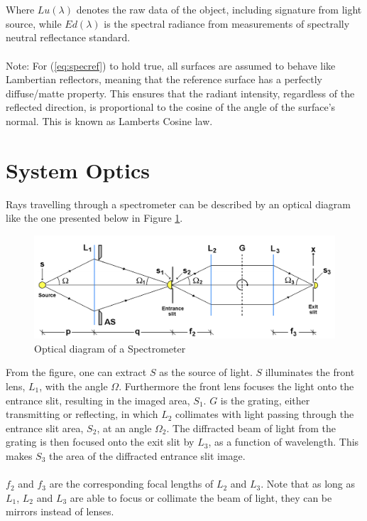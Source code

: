 \\\\
Where $Lu(\lambda)$ denotes the raw data of the object, including signature from light source, while $Ed(\lambda)$ is the spectral radiance from measurements of spectrally neutral reflectance standard.
\\\\
Note: For (\ref{eq:specref}) to hold true, all surfaces are assumed to behave like Lambertian reflectors, meaning that the reference surface has a perfectly diffuse/matte property. This ensures that the radiant intensity, regardless of the reflected direction, is proportional to the cosine of the angle of the surface's normal. This is known as Lamberts Cosine law. 



\vspace{1.3cm}
\section{System Optics} \label{sec:sysopt}
Rays travelling through a spectrometer can be described by an optical diagram like the one presented below in Figure \ref{fig:sysopt}.
\begin{figure}[H]
    \centering
    \includegraphics[width = 12cm]{Images/theory/sysop.png}
    \caption{Optical diagram of a Spectrometer}
    \label{fig:sysopt}
\end{figure}
\noindent
From the figure, one can extract $S$ as the source of light. $S$ illuminates the front lens, $L_1$, with the angle $\Omega$. Furthermore the front lens focuses the light onto the entrance slit, resulting in the imaged area, $S_1$. $G$ is the grating, either transmitting or reflecting, in which $L_2$ collimates with light passing through the entrance slit area, $S_2$, at an angle  $\Omega_2$. The diffracted beam of light from the grating is then focused onto the exit slit by $L_3$, as a function of wavelength. This makes $S_3$ the area of the diffracted entrance slit image. 
\\\\
$f_2$ and $f_3$ are the corresponding focal lengths of $L_2$ and $L_3$. Note that as long as $L_1$, $L_2$ and $L_3$ are able to focus or collimate the beam of light, they can be mirrors instead of lenses. 
\\\\

